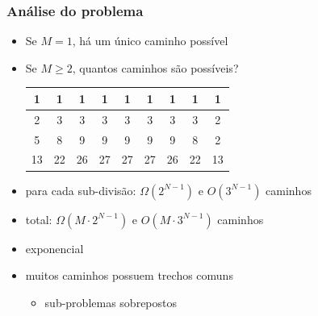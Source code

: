 \documentclass{beamer}
\begin{document}
\begin{frame}
\frametitle{Análise do problema}

\begin{itemize}

\item Se $M=1$, há um único caminho possível

\item Se $M \ge 2$, quantos caminhos são possíveis?

\begin{tabular}{|c|c|c|c|c|c|c|c|c|}
\hline
1 & 1 & 1 & 1 & 1 & 1 & 1 & 1 & 1 \\
\hline
2 & 3 & 3 & 3 & 3 & 3 & 3 & 3 & 2 \\
\hline
5 & 8 & 9 & 9 & 9 & 9 & 9 & 8 & 2 \\
\hline
13 & 22 & 26 & 27 & 27 & 27 & 26 & 22 & 13 \\
\hline
\end{tabular}

\item para cada sub-divisão: $\Omega(2^{N-1})$ e $O(3^{N-1})$ caminhos

\item total: $\Omega(M \cdot 2^{N-1})$ e $O(M \cdot 3^{N-1})$ caminhos

\item exponencial

\item muitos caminhos possuem trechos comuns 

\begin{itemize}

\item \alert{sub-problemas sobrepostos}

\end{itemize}

\end{itemize}

\end{frame}
\end{document}
